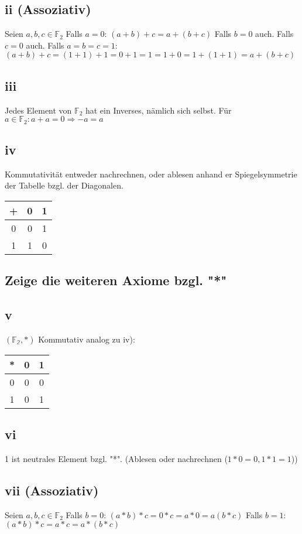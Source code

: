 \documentclass[11pt]{scrartcl}
\begin{document}
\subsection{ii (Assoziativ)}
Seien $a,b,c \in \mathbb F_{2}$
Falls $a=0$:
$(a+b)+c = a+(b+c)$
Falls $b=0$ auch. Falls $c=0$ auch. Falls $a=b=c=1$:
$(a+b)+c = (1+1)+1 = 0+1=1=1+0=1+(1+1) = a+(b+c)$
\subsection{iii}
Jedes Element von $\mathbb F_{2}$ hat ein Inverses, nämlich sich selbst. Für $a \in \mathbb F_{2}: a+a=0 \Rightarrow -a = a$
\subsection{iv}
Kommutativität entweder nachrechnen, oder ablesen anhand er Spiegelsymmetrie der Tabelle bzgl. der Diagonalen. \\

\begin{tabular}[h]{c|c|c}
	+ & 0 & 1 \\
	\hline
	0&0&1\\
    \hline
	1&1&0\\
		
\end{tabular}
\subsection*{Zeige die weiteren Axiome bzgl. "*"}
\subsection{v}
$(\mathbb{F_{2}},*)$ Kommutativ analog zu iv):
\begin{tabular}[h]{c|c|c}
	* & 0 & 1 \\
	\hline
	0&0&0\\
	\hline
	1&0&1\\
	
\end{tabular}
\subsection{vi}
1 ist neutrales Element bzgl. "*". (Ablesen oder nachrechnen ($1*0=0,1*1=1$))
\subsection{vii (Assoziativ)}
Seien $a,b,c \in \mathbb F_{2}$
Falls $b=0$:
$(a*b)*c = 0*c = a*0= a(b*c)$
Falls $b=1$: 
$(a*b)*c = a*c = a*(b*c)$
\end{document}

